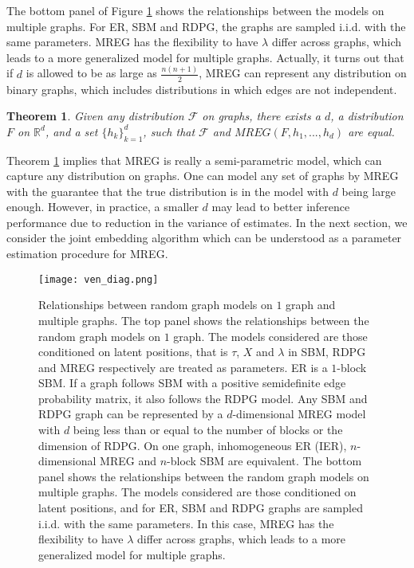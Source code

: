 \documentclass[10pt,journal,compsoc]{IEEEtran}
\newtheorem{theorem}{Theorem}[section]
\begin{document}
\noindent The bottom panel of Figure \ref{fig:ven} shows the relationships between the models on multiple graphs. For ER, SBM  and RDPG, the graphs are sampled i.i.d. with the same parameters. MREG has the flexibility to have $\lambda$ differ across graphs, which leads to a more generalized model for multiple graphs. Actually, it turns out that if $d$ is allowed to be as large as $\frac{n(n+1)}{2}$, MREG can represent any distribution on binary graphs, which includes distributions in which edges are not independent.   
\begin{theorem}
	Given any distribution $\mathcal{F}$ on graphs, there exists a $d$, a distribution $F$ on $\mathbb{R}^d$, and a set $\{h_k\}_{k=1}^d$, such that $\mathcal{F}$ and $MREG(F,h_1,...,h_d)$ are equal.
	\label{thm:rep}
\end{theorem}
Theorem \ref{thm:rep} implies that MREG is really a semi-parametric model, which can capture any distribution on graphs. One can model any set of graphs by MREG with the guarantee that the true distribution is in the model with $d$ being large enough. However, in practice, a smaller $d$ may lead to better inference performance due to reduction in the variance of estimates. In the next section, we consider the joint embedding algorithm which can be understood as a parameter estimation procedure for MREG.
\begin{figure}[!htbp]
	\centering
	\texttt{[image: ven\_diag.png]}
	\caption{Relationships between random graph models on $1$ graph and multiple graphs. The top panel shows the relationships between the random graph models on $1$ graph. The models considered are those conditioned on latent positions, that is $\tau$, $X$ and $\lambda$ in SBM, RDPG and MREG respectively are treated as parameters. ER is a $1$-block SBM. If a graph follows SBM with a positive semidefinite edge probability matrix, it also follows the RDPG model. Any  SBM and  RDPG graph can be represented by a $d$-dimensional MREG model with $d$ being less than or equal to the number of blocks or the dimension of RDPG. On one graph, inhomogeneous ER (IER), $n$-dimensional MREG and $n$-block SBM are equivalent. The bottom panel shows the relationships between the random graph models on multiple graphs. The models considered are those conditioned on latent positions, and for ER, SBM and RDPG graphs are sampled i.i.d. with the same parameters. In this case, MREG has the flexibility to have $\lambda$ differ across graphs, which leads to a more generalized model for multiple graphs.}
	\label{fig:ven}
\end{figure}
\end{document}
